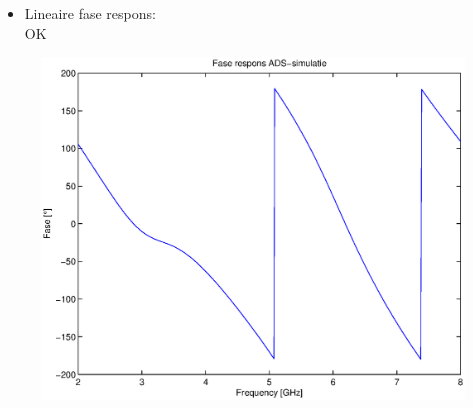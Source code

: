 \documentclass{beamer}
\begin{document}
\begin{frame}
\begin{columns}[c]
      \begin{column}{0.5\textwidth}
      \begin{itemize}
        \item Lineaire fase respons: \\ OK
      \end{itemize}
        \begin{figure}
          \includegraphics[width=\textwidth]{images/fase_respons_ADS_sim.eps}
        \end{figure}
      \end{column}
    \end{columns}
  \end{frame}
\end{document}
